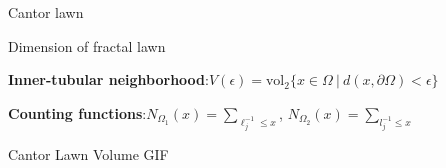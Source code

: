 \documentclass{if-beamer}
\begin{document}
\begin{frame}{Cantor lawn}
	\begin{center}
	\end{center}
\end{frame}

\begin{frame}{Dimension of fractal lawn}

{\bf Inner-tubular neighborhood}:\quad $V(\epsilon) = \text{vol}_2\{x \in \Omega\ |\ d(x,\partial\Omega) < \epsilon\}$
\vspace{.2in}

{\bf Counting functions}:\quad $N_{\Omega_1}(x) = \sum_{\ell_j^{-1} \leq x}$, $N_{\Omega_2}(x) = \sum_{l_j^{-1} \leq x}$
\end{frame}

\begin{frame}{Cantor Lawn Volume GIF}
	\begin{center}
	\end{center}
\end{frame}
\end{document}

